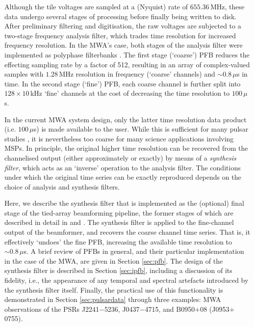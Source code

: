 \documentclass{pasa}%
\newcommand{\psrslowB}{B0950$+$08}
\newcommand{\psrslowJ}{J0953$+$0755}
\newcommand{\psrkaurJ}{J2241$-$5236}
\newcommand{\psrbhatJ}{J0437$-$4715}
\begin{document}
Although the tile voltages are sampled at a (Nyquist) rate of $655.36\,$MHz, these data undergo several stages of processing before finally being written to disk.
After preliminary filtering and digitisation, the raw voltages are subjected to a two-stage frequency analysis filter, which trades time resolution for increased frequency resolution.
In the MWA's case, both stages of the analysis filter were implemented as polyphase filterbanks \citep[PFBs;][\dots]{Harris2011,Prabu2015}.
The first stage (`coarse') PFB reduces the effecting sampling rate by a factor of 512, resulting in an array of complex-valued samples with $1.28\,$MHz resolution in frequency (`coarse' channels) and $\sim0.8\,\mu$s in time.
In the second stage (`fine') PFB, each coarse channel is further split into $128 \times 10\,$kHz `fine' channels at the cost of decreasing the time resolution to $100\,\mu$s.

In the current MWA system design, only the latter time resolution data product (i.e. $100\,\mu$s) is made available to the user.
While this is sufficient for many pulsar studies \citep[e.g.][]{Oronsaye2015,McSweeney2017,Bhat2018,Meyers2018}, it is nevertheless too coarse for many science applications involving MSPs.
In principle, the original higher time resolution can be recovered from the channelised output (either approximately or exactly) by means of a \textit{synthesis filter}, which acts as an `inverse' operation to the analysis filter.
The conditions under which the original time series can be exactly reproduced depends on the choice of analysis and synthesis filters.

Here, we describe the synthesis filter that is implemented as the (optional) final stage of the tied-array beamforming pipeline, the former stages of which are described in detail in \citet[][hereafter Paper I]{Ord2019} and \citet[][hereafter Paper II]{Xue2019}.
The synthesis filter is applied to the fine-channel output of the beamformer, and recovers the coarse channel time series.
That is, it effectively `undoes' the fine PFB, increasing the available time resolution to $\sim 0.8\,\mu$s.
A brief review of PFBs in general, and their particular implementation in the case of the MWA, are given in Section \ref{sec:pfb}.
The design of the synthesis filter is described in Section \ref{sec:ipfb}, including a discussion of its fidelity, i.e., the appearance of any temporal and spectral artefacts introduced by the synthesis filter itself.
Finally, the practical use of this functionality is demonstrated in Section \ref{sec:pulsardata} through three examples: MWA observations of the PSRs \psrkaurJ{}, \psrbhatJ{}, and \psrslowB{} (\psrslowJ{}).
\end{document}
